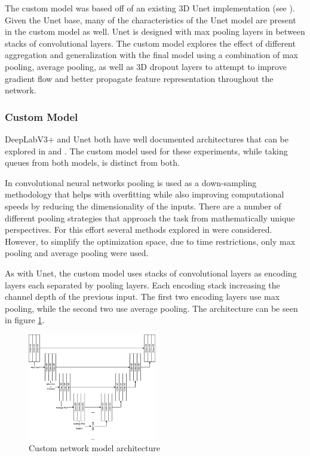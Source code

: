 \documentclass[10pt,twocolumn,letterpaper]{article}
\begin{document}
The custom model was based off of an existing 3D Unet implementation (see \cite{10.7554/eLife.57613}). Given the Unet base, many of the characteristics of the Unet model are present in the custom model as well. Unet is designed with max pooling layers in between stacks of convolutional layers. The custom model explores the effect of different aggregation and generalization with the final model using a combination of max pooling, average pooling, as well as 3D dropout layers to attempt to improve gradient flow and better propagate feature representation throughout the network.

\subsubsection{Custom Model}

DeepLabV3+ and Unet both have well documented architectures that can be explored in \cite{https://doi.org/10.48550/arxiv.1802.02611} and \cite{https://doi.org/10.48550/arxiv.1505.04597}. The custom model used for these experiments, while taking queues from both models, is distinct from both.

In convolutional neural networks pooling is used as a down-sampling methodology that helps with overfitting while also improving computational speeds by reducing the dimensionality of the inputs. There are a number of different pooling strategies that approach the task from mathematically unique perspectives. For this effort several methods explored in \cite{https://doi.org/10.48550/arxiv.2009.07485} were considered. However, to simplify the optimization space, due to time restrictions, only max pooling and average pooling were used.

As with Unet, the custom model uses stacks of convolutional layers as encoding layers each separated by pooling layers. Each encoding stack increasing the channel depth of the previous input. The first two encoding layers use max pooling, while the second two use average pooling. The architecture can be seen in figure \ref{fig:custom-model-arch}.

\begin{figure}[h]
\centering
\includegraphics[width=0.5\textwidth]{figures/custom-model.png}
\caption{Custom network model architecture}
\label{fig:custom-model-arch}
\end{figure}
\end{document}
